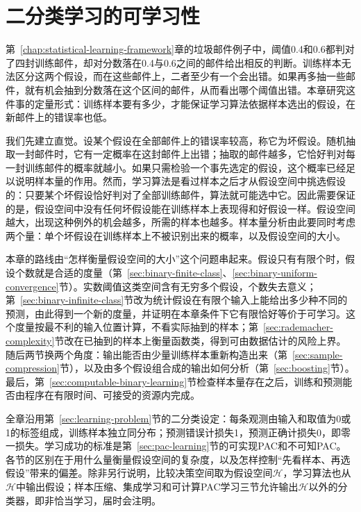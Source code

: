 \chapter{二分类学习的可学习性}
\label{chap:binary-learnability}

第~\ref{chap:statistical-learning-framework}章的垃圾邮件例子中，阈值0.4和0.6都判对了四封训练邮件，却对分数落在0.4与0.6之间的邮件给出相反的判断。训练样本无法区分这两个假设，而在这些邮件上，二者至少有一个会出错。如果再多抽一些邮件，就有机会抽到分数落在这个区间的邮件，从而看出哪个阈值出错。本章研究这件事的定量形式：训练样本要有多少，才能保证学习算法依据样本选出的假设，在新邮件上的错误率也低。

我们先建立直觉。设某个假设在全部邮件上的错误率较高，称它为坏假设。随机抽取一封邮件时，它有一定概率在这封邮件上出错；抽取的邮件越多，它恰好判对每一封训练邮件的概率就越小。如果只需检验一个事先选定的假设，这个概率已经足以说明样本量的作用。然而，学习算法是看过样本之后才从假设空间中挑选假设的：只要某个坏假设恰好判对了全部训练邮件，算法就可能选中它。因此需要保证的是，假设空间中没有任何坏假设能在训练样本上表现得和好假设一样。假设空间越大，出现这种例外的机会越多，所需的样本也越多。样本量分析由此要同时考虑两个量：单个坏假设在训练样本上不被识别出来的概率，以及假设空间的大小。

本章的路线由“怎样衡量假设空间的大小”这个问题串起来。假设只有有限个时，假设个数就是合适的度量（第~\ref{sec:binary-finite-class}、\ref{sec:binary-uniform-convergence}节）。实数阈值这类空间含有无穷多个假设，个数失去意义；第~\ref{sec:binary-infinite-class}节改为统计假设在有限个输入上能给出多少种不同的预测，由此得到一个新的度量，并证明在本章条件下它有限恰好等价于可学习。这个度量按最不利的输入位置计算，不看实际抽到的样本；第~\ref{sec:rademacher-complexity}节改在已抽到的样本上衡量函数类，得到可由数据估计的风险上界。随后两节换两个角度：输出能否由少量训练样本重新构造出来（第~\ref{sec:sample-compression}节），以及由多个假设组合成的输出如何分析（第~\ref{sec:boosting}节）。最后，第~\ref{sec:computable-binary-learning}节检查样本量存在之后，训练和预测能否由程序在有限时间、可接受的资源内完成。

全章沿用第~\ref{sec:learning-problem}节的二分类设定：每条观测由输入和取值为0或1的标签组成，训练样本独立同分布；预测错误计损失1，预测正确计损失0，即零一损失。学习成功的标准是第~\ref{sec:pac-learning}节的可实现PAC和不可知PAC。各节的区别在于用什么量衡量假设空间的复杂度，以及怎样控制“先看样本、再选假设”带来的偏差。除非另行说明，比较决策空间取为假设空间$\mathcal H$，学习算法也从$\mathcal H$中输出假设；样本压缩、集成学习和可计算PAC学习三节允许输出$\mathcal H$以外的分类器，即非恰当学习，届时会注明。

